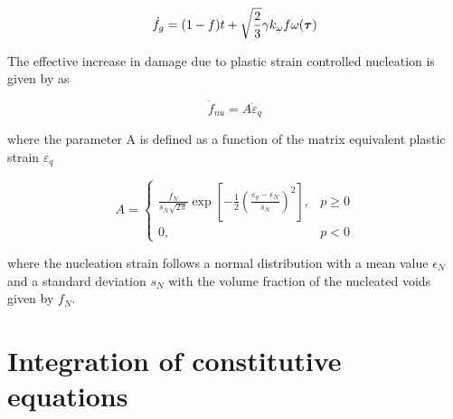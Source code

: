 \documentclass[11pt]{article}
\theoremstyle{remark}
\begin{document}
\begin{equation}\label{eq:fg_final}
\dot{f}_g = (1-f)t + \sqrt{\frac{2}{3}}\gamma k_{\omega}f
\omega({\boldsymbol{\tau}})
\end{equation}

The effective increase in damage due to plastic strain controlled
nucleation is given by \cite{Chu1980} as

\begin{equation}\label{eq:dotf_nu}
\dot{f}_{nu} = A \dot{\varepsilon}_q
\end{equation}

where the parameter A is defined as a function of the matrix
equivalent plastic strain $\varepsilon_q$

\begin{equation}
A =
   \begin{cases}
     \frac{f_N}{s_N\sqrt{2\pi}}\exp\left[ -\frac{1}{2}\left(
       \frac{\varepsilon_q - \epsilon_N}{s_N}\right)^2\right], & p
     \geq 0\\ 0, & p <0
	\end{cases}
\end{equation}

where the nucleation strain follows a normal distribution with a mean
value $\epsilon_N$ and a standard deviation $s_N$ with the volume
fraction of the nucleated voids given by $f_N$.


\section{Integration of constitutive equations} \label{sec:integration}

\end{document}
